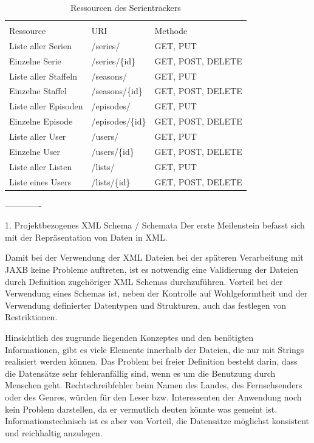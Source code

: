 \documentclass[a4paper]{article}
\begin{document}
\begin{table}[h]
\caption{Ressourcen des Serientrackers}  %

\centering %
\begin{tabular}{l l l} %
\hline\hline %
 \\ [-0.5ex] 
 Ressource & URI & Methode 
\\ [1ex] 
\hline %
Liste aller Serien & /series/ & GET, PUT \\[1ex]
Einzelne Serie & /series/\{id\} & GET, POST, DELETE\\[1ex]
Liste aller Staffeln & /seasons/ & GET, PUT \\[1ex]
Einzelne Staffel & /seasons/\{id\} & GET, POST, DELETE\\[1ex]
Liste aller Episoden & /episodes/ & GET, PUT \\[1ex]
Einzelne Episode & /episodes/\{id\} & GET, POST, DELETE\\[1ex]
Liste aller User & /users/ & GET, PUT \\[1ex]
Einzelne User & /users/\{id\} & GET, POST, DELETE\\[1ex]
Liste aller Listen & /lists/ & GET, PUT\\[1ex]
Liste eines Users & /lists/\{id\} & GET, POST, DELETE\\[1ex]
\hline %
\end{tabular}
\label{tab:PPer}
\end{table}
-------------











1. Projektbezogenes XML Schema / Schemata
Der erste Meilenstein befasst sich mit der Repräsentation von Daten in XML. 


Damit bei der Verwendung der XML Dateien bei der späteren Verarbeitung mit JAXB keine Probleme auftreten, 
ist es notwendig eine Validierung der Dateien durch Definition zugehöriger XML Schemas durchzuführen.   
Vorteil bei der Verwendung eines Schemas ist, neben der Kontrolle auf Wohlgeformtheit und der Verwendung 
definierter Datentypen und Strukturen, auch das festlegen von Restriktionen.  

Hinsichtlich des zugrunde liegenden Konzeptes und den benötigten Informationen, gibt es viele Elemente 
innerhalb der Dateien, die nur mit Strings realisiert werden können. Das Problem bei freier Definition 
besteht darin, dass die Datensätze sehr fehleranfällig sind, wenn es um die Benutzung durch Menschen geht.  
Rechtschreibfehler beim Namen des Landes, des Fernsehsenders oder des Genres, würden für den Leser bzw. 
Interessenten der Anwendung noch kein Problem darstellen, da er vermutlich deuten könnte was gemeint ist.
Informationstechnisch ist es aber von Vorteil, die Datensätze möglichst konsistent und reichhaltig anzulegen. 
\end{document}
